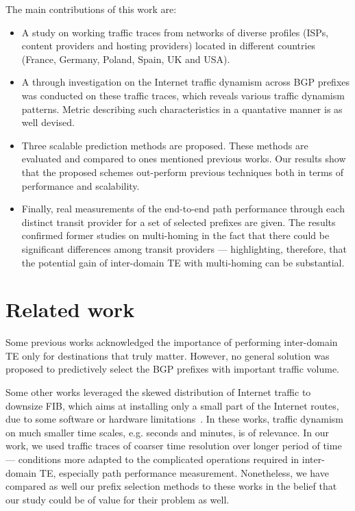 The main contributions of this work are:
\begin{itemize}
\item A study on working traffic traces from networks of diverse profiles (\acp{ISP}, content providers and hosting providers) located in different countries (France, Germany, Poland, Spain, UK and USA).
\item A through investigation on the Internet traffic dynamism across BGP prefixes was conducted on these traffic traces, which reveals various traffic dynamism patterns. Metric describing such characteristics in a quantative manner is as well devised.
\item Three scalable prediction methods are proposed. 
These methods are evaluated and compared to ones mentioned previous works. Our results show that the proposed schemes out-perform previous techniques both in terms of performance and scalability. 
\item Finally, real measurements of the end-to-end path performance through each distinct transit provider for a set of selected prefixes are given. The results confirmed former studies on multi-homing in the fact that there could be significant differences among transit providers --- highlighting, therefore, that the potential gain of inter-domain TE with multi-homing can be substantial. 
\end{itemize}


\section{Related work}

Some previous works \cite{Feamster2003, Akella2008, Goldenberg2004} acknowledged the importance of performing inter-domain TE only for destinations that truly matter.
However, no general solution was proposed to predictively select the BGP prefixes with important traffic volume.

Some other works leveraged the skewed distribution of Internet traffic to downsize \ac{FIB}, 
which aims at installing only a small part of the Internet routes, due to some software or hardware limitations~\cite{Iannone2007, Ballani2009, Kim2009, Zhang2012, Sarrar2012, Liu2015}.
In these works, traffic dynamism on much smaller time scales, e.g. seconds and minutes, is of relevance. 
In our work, we used traffic traces of coarser time resolution over longer period of time --- conditions more adapted to the complicated operations required in inter-domain TE, especially path performance measurement.
Nonetheless, we have compared as well our prefix selection methods to these works in the belief that our study could be of value for their problem as well. 

